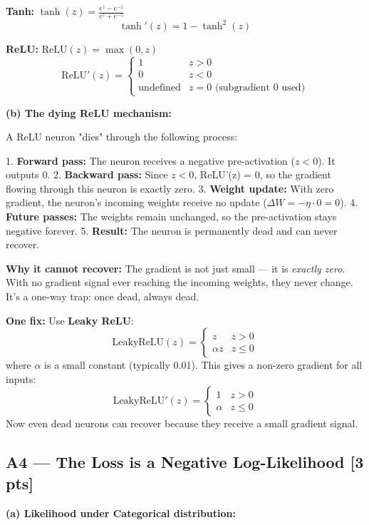\documentclass[11pt,a4paper]{article}
\begin{document}
\textbf{Tanh:} $\tanh(z) = \frac{e^z - e^{-z}}{e^z + e^{-z}}$
\[
\tanh'(z) = 1 - \tanh^2(z)
\]

\textbf{ReLU:} $\text{ReLU}(z) = \max(0, z)$
\[
\text{ReLU}'(z) = \begin{cases}
1 & z > 0 \\
0 & z < 0 \\
\text{undefined} & z = 0 \text{ (subgradient } 0 \text{ used)}
\end{cases}
\]

\textbf{(b) The dying ReLU mechanism:}

A ReLU neuron "dies" through the following process:

1. \textbf{Forward pass:} The neuron receives a negative pre-activation ($z < 0$). It outputs 0.
2. \textbf{Backward pass:} Since $z < 0$, ReLU'(z) = 0, so the gradient flowing through this neuron is exactly zero.
3. \textbf{Weight update:} With zero gradient, the neuron's incoming weights receive no update ($\Delta W = -\eta \cdot 0 = 0$).
4. \textbf{Future passes:} The weights remain unchanged, so the pre-activation stays negative forever.
5. \textbf{Result:} The neuron is permanently dead and can never recover.

\textbf{Why it cannot recover:} The gradient is not just small — it is \emph{exactly zero}. With no gradient signal ever reaching the incoming weights, they never change. It's a one-way trap: once dead, always dead.

\textbf{One fix:} Use \textbf{Leaky ReLU}:
\[
\text{LeakyReLU}(z) = \begin{cases}
z & z > 0 \\
\alpha z & z \leq 0
\end{cases}
\]
where $\alpha$ is a small constant (typically 0.01). This gives a non-zero gradient for all inputs:
\[
\text{LeakyReLU}'(z) = \begin{cases}
1 & z > 0 \\
\alpha & z \leq 0
\end{cases}
\]
Now even dead neurons can recover because they receive a small gradient signal.

\subsection*{A4 --- The Loss is a Negative Log-Likelihood \hfill [3 pts]}

\textbf{(a) Likelihood under Categorical distribution:}
\end{document}
